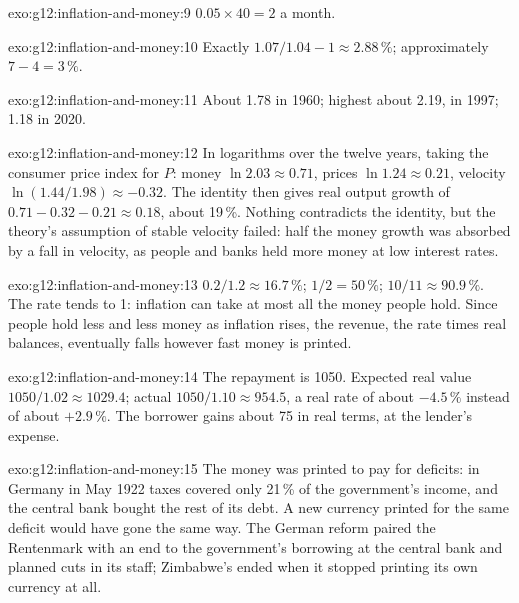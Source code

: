 \begin{solution}{exo:g12:inflation-and-money:9}
$0.05 \times 40 = 2$ a month.
\end{solution}

\begin{solution}{exo:g12:inflation-and-money:10}
Exactly $1.07/1.04 - 1 \approx 2.88\,\%$; approximately $7 - 4 = 3\,\%$.
\end{solution}

\begin{solution}{exo:g12:inflation-and-money:11}
About 1.78 in 1960; highest about 2.19, in 1997; 1.18 in 2020.
\end{solution}

\begin{solution}{exo:g12:inflation-and-money:12}
In logarithms over the twelve years, taking the consumer price index for $P$: money $\ln 2.03 \approx 0.71$, prices $\ln 1.24 \approx 0.21$, velocity
$\ln(1.44/1.98) \approx -0.32$. The identity then gives real output growth of $0.71 - 0.32 - 0.21 \approx 0.18$, about 19\,\%. Nothing contradicts the identity, but the theory's assumption of stable velocity failed: half the money growth was
absorbed by a fall in velocity, as people and banks held more money at low interest rates.
\end{solution}

\begin{solution}{exo:g12:inflation-and-money:13}
$0.2/1.2 \approx 16.7\,\%$; $1/2 = 50\,\%$; $10/11 \approx 90.9\,\%$. The rate tends to 1: inflation can take at most all the money people hold. Since people hold less and
less money as inflation rises, the revenue, the rate times real balances, eventually falls however fast money is printed.
\end{solution}

\begin{solution}{exo:g12:inflation-and-money:14}
The repayment is 1050. Expected real value $1050/1.02 \approx 1029.4$; actual $1050/1.10 \approx 954.5$, a real rate of about $-4.5\,\%$ instead of about $+2.9\,\%$. The
borrower gains about 75 in real terms, at the lender's expense.
\end{solution}

\begin{solution}{exo:g12:inflation-and-money:15}
The money was printed to pay for deficits: in Germany in May 1922 taxes covered only 21\,\% of the government's income, and the central bank bought the rest of its debt. A
new currency printed for the same deficit would have gone the same way. The German reform paired the Rentenmark with an end to the government's borrowing at the central bank
and planned cuts in its staff; Zimbabwe's ended when it stopped printing its own currency at all.
\end{solution}

